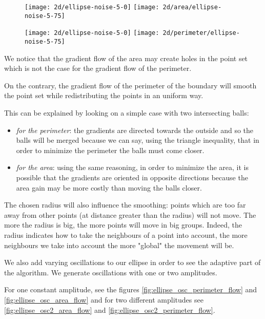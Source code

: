 \begin{figure}[h]
    \centering

    \texttt{[image: 2d/ellipse-noise-5-0]}
    \texttt{[image: 2d/area/ellipse-noise-5-75]}
    \label{fig:ellipse_noise_area_flow}

    \texttt{[image: 2d/ellipse-noise-5-0]}
    \texttt{[image: 2d/perimeter/ellipse-noise-5-75]}
    \label{fig:ellipse_noise_perimeter_flow}
\end{figure}

We notice that the gradient flow of the area may create holes in the point set
which is not the case for the gradient flow of the perimeter.

On the contrary, the gradient flow of the perimeter of the boundary will smooth
the point set while redistributing the points in an uniform way.

This can be explained by looking on a simple case with two intersecting balls:
\begin{itemize}
    \item \textit{for the perimeter}: the gradients are directed towards the outside
        and so the balls will be merged because we can say, using the triangle
        inequality, that in order to minimize the perimeter the balls must come
        closer.
    \item \textit{for the area}: using the same reasoning, in order to minimize the area,
        it is possible that the gradients are oriented in opposite directions
        because the area gain may be more costly than moving the balls closer.
\end{itemize}

The chosen radius will also influence the smoothing: points which are too far
away from other points (at distance greater than the radius) will not move. The
more the radius is big, the more points will move in big groups. Indeed, the
radius indicates how to take the neighbours of a point into account, the more
neighbours we take into account the more "global" the movement will be.

We also add varying oscillations to our ellipse in order to see the
adaptive part of the algorithm. We generate oscillations with one or two
amplitudes.

For one constant amplitude, see the figures \ref{fig:ellipse_osc_perimeter_flow} and
\ref{fig:ellipse_osc_area_flow} and for two different amplitudes see
\ref{fig:ellipse_osc2_area_flow} and \ref{fig:ellipse_osc2_perimeter_flow}.

